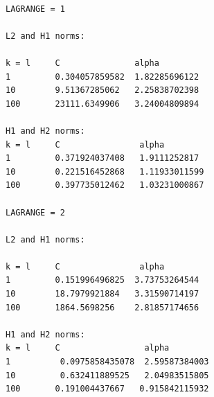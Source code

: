 \documentclass[a4paper,norsk]{article}
\begin{document}
\begin{lstlisting}

LAGRANGE = 1

L2 and H1 norms:

k = l     C               alpha
1         0.304057859582  1.82285696122
10        9.51367285062   2.25838702398
100       23111.6349906   3.24004809894

H1 and H2 norms:
k = l     C                alpha
1         0.371924037408   1.9111252817
10        0.221516452868   1.11933011599
100       0.397735012462   1.03231000867

LAGRANGE = 2

L2 and H1 norms:

k = l     C                alpha
1         0.151996496825  3.73753264544
10        18.7979921884   3.31590714197
100       1864.5698256    2.81857174656

H1 and H2 norms:
k = l     C                 alpha
1          0.0975858435078  2.59587384003
10         0.632411889525   2.04983515805
100       0.191004437667   0.915842115932
\end{lstlisting}
\end{document}
